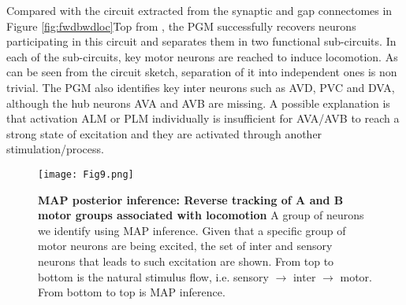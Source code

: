 \documentclass[letterpaper,11pt]{article}
\begin{document}
Compared with the circuit extracted from the synaptic and gap connectomes in Figure \ref{fig:fwdbwdloc}Top from \cite{dynamic1}, the PGM successfully recovers neurons participating in this circuit and separates them in two functional sub-circuits. In each of the sub-circuits, key motor neurons are reached to induce locomotion. As can be seen from the circuit sketch, separation of it into independent ones is non trivial. The PGM also identifies  key inter neurons such as AVD, PVC and DVA, although the hub neurons AVA and AVB are missing. A possible explanation is that activation ALM or PLM individually is  insufficient for AVA/AVB to reach a strong state of excitation and they are activated through another stimulation/process.
\begin{figure}[h!]
    \centering
    \texttt{[image: Fig9.png]}
    \caption{\textbf{MAP posterior inference: Reverse tracking of A and B motor groups associated with locomotion} A group of neurons we identify using MAP inference. Given that a specific group of motor neurons are being excited, the set of inter and sensory neurons that leads to such excitation are shown. From top to bottom is the natural stimulus flow, i.e. sensory $\to$ inter $\to$ motor. From bottom to top is MAP inference. }\label{fig:MAP}
\end{figure}
\end{document}
